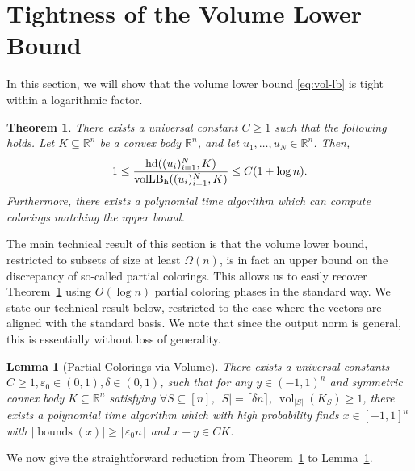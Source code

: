 \documentclass[12pt]{article}
\newtheorem{theorem}{Theorem}
\newtheorem{lemma}{Lemma}
\newcommand{\ceil}[1]{\lceil #1 \rceil}
\newcommand{\R}{{\mathbb{R}}}
\newcommand\eps{\varepsilon}
\DeclareMathOperator{\vollb}{volLB}
\DeclareMathOperator{\hd}{hd}
\DeclareMathOperator{\vol}{vol}
\DeclareMathOperator{\bnds}{bounds}
\begin{document}
\section{Tightness of the Volume Lower Bound}

In this section, we will show that the volume lower bound \eqref{eq:vol-lb} is
tight within a logarithmic factor. 

\begin{theorem}\label{thm:tightness}
There exists a universal constant $C \geq 1$ such that the following
holds. Let $K \subseteq \R^n$ be a convex body $\R^n$, and let $u_1,
\ldots, u_N \in \R^n$. Then,
\[
1 \le \frac{\hd((u_i)_{i = 1}^N, K)}{\vollb_{\rm h}((u_i)_{i = 1}^N, K) } \le C(1+\log n).
\]
Furthermore, there exists a polynomial time algorithm which can compute
colorings matching the upper bound. 
\end{theorem}

The main technical result of this section is that the volume lower bound,
restricted to subsets of size at least $\Omega(n)$, is in fact an upper bound on
the discrepancy of so-called partial colorings. This allows us to easily recover
Theorem~\ref{thm:tightness} using $O(\log n)$ partial coloring phases in the
standard way. We state our technical result below, restricted to the case where
the vectors are aligned with the standard basis. We note that since the output
norm is general, this is essentially without loss of generality. 

\begin{lemma}[Partial Colorings via Volume] \label{lem:partial-via-volume}
There exists a universal constants $C \geq 1, \eps_0 \in (0,1), \delta \in (0,1)$, such that
for any $y \in (-1,1)^n$ and symmetric convex body $K \subseteq \R^n$ satisfying
$\forall S \subseteq [n]$, $|S| = \ceil{\delta n}$, $\vol_{|S|}(K_S) \geq 1$, there
exists a polynomial time algorithm which with high probability finds $x \in
[-1,1]^n$ with $|\bnds(x)| \geq \ceil{\eps_0 n}$ and
$x-y \in C K$.  
\end{lemma}

We now give the straightforward reduction from Theorem~\ref{thm:tightness} to
Lemma~\ref{lem:partial-via-volume}.
\end{document}

